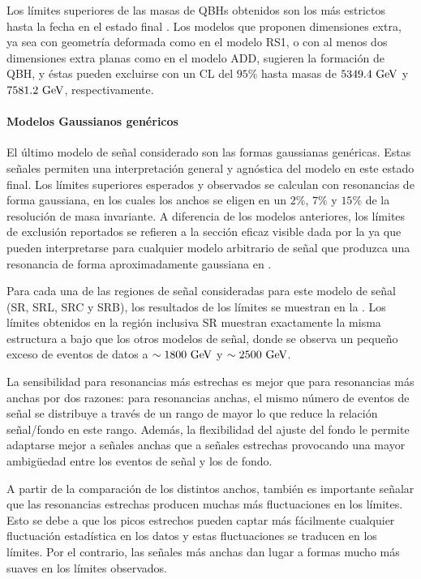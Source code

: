 Los límites superiores de las masas de \acp{QBH} obtenidos son los más estrictos hasta la fecha en el estado final \gammajet. Los modelos que proponen dimensiones extra, ya sea con geometría deformada como en el modelo RS1, o con al menos dos dimensiones extra planas como en el modelo ADD, sugieren la formación de \ac{QBH}, y éstas pueden excluirse con un \ac{CL} del \(95\%\) hasta masas de \(5349.4~\text{GeV}\) y \(7581.2~\text{GeV}\), respectivamente.




\paragraph{Modelos Gaussianos genéricos}
\label{paragraph:results:results:bkgsig:results:gaus}


El último modelo de señal considerado son las formas gaussianas genéricas. Estas señales permiten una interpretación general y agnóstica del modelo en este estado final. Los límites superiores esperados y observados se calculan con resonancias de forma gaussiana, en los cuales los anchos se eligen en un \(2\%\), \(7\%\) y \(15\%\) de la resolución de masa invariante. A diferencia de los modelos anteriores, los límites de exclusión reportados se refieren a la sección eficaz visible dada por la \Eqn{\ref{eq:results:results:bkgsig:results:visible_xs}} ya que pueden interpretarse para cualquier modelo arbitrario de señal que produzca una resonancia \gammajet de forma aproximadamente gaussiana en \myj.

Para cada una de las regiones de señal consideradas para este modelo de señal (SR, SRL, SRC y SRB), los resultados de los límites se muestran en la \Fig{\ref{fig:results:results:bkgsig:results:gaus:limits}}.
Los límites obtenidos en la región inclusiva SR muestran exactamente la misma estructura a bajo \myj que los otros modelos de señal, donde se observa un pequeño exceso de eventos de datos a \(\sim 1800~\text{GeV}\) y \(\sim 2500~\text{GeV}\).

La sensibilidad para resonancias más estrechas es mejor que para resonancias más anchas por dos razones: para resonancias anchas, el mismo número de eventos de señal se distribuye a través de un rango de \myj mayor lo que reduce la relación señal/fondo en este rango. Además, la flexibilidad del ajuste del fondo le permite adaptarse mejor a señales anchas que a señales estrechas provocando una mayor ambigüedad entre los eventos de señal y los de fondo.

A partir de la comparación de los distintos anchos, también es importante señalar que las resonancias estrechas producen muchas más fluctuaciones en los límites. Esto se debe a que los picos estrechos pueden captar más fácilmente cualquier fluctuación estadística en los datos y estas fluctuaciones se traducen en los límites. Por el contrario, las señales más anchas dan lugar a formas mucho más suaves en los límites observados.

